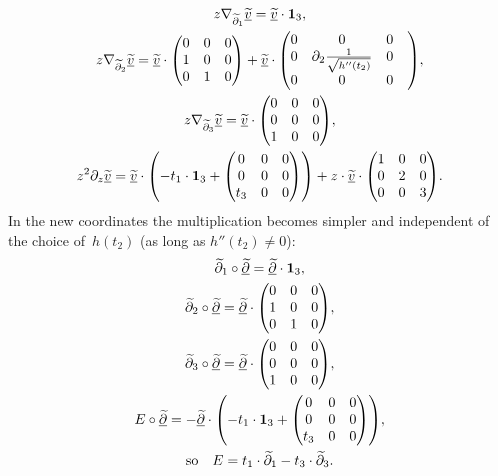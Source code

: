 \documentclass[10pt,a4paper]{amsart}
\numberwithin{equation}{section}
\numberwithin{figure}{section}
\newcommand{\www}{\widetilde}
\newcommand{\uuuu}{\underline}
\newcommand{\paa}{\partial}
\newcommand{\nnn}{\nabla}
\begin{document}
\begin{gather*}%
z\nnn_{\www\paa_1}\uuuu{\www v}=\uuuu{\www v}\cdot {\bf 1}_3,
\\
z\nnn_{\www\paa_2}\uuuu{\www v}=\uuuu{\www v}\cdot
\begin{pmatrix}0&0&0\\1&0&0\\0&1&0\end{pmatrix}
+\uuuu{\www v}\cdot
\begin{pmatrix}0&0&0\\0&\paa_2\frac{1}{\sqrt{h''(t_2)}}&0
\\
0&0&0&\end{pmatrix}\!,
\\
z\nnn_{\www\paa_3}\uuuu{\www v}=\uuuu{\www v}\cdot
\begin{pmatrix}0&0&0\\0&0&0\\1&0&0\end{pmatrix}\!,
\\
z^2\paa_z\uuuu{\www v}=\uuuu{\www v}\cdot
\left(-t_1\cdot {\bf 1}_3
+\begin{pmatrix}0&0&0\\0&0&0\\t_3&0&0\end{pmatrix}\right)
+z\cdot\uuuu{\www v}\cdot
\begin{pmatrix}1&0&0\\0&2&0\\0&0&3\end{pmatrix}\!.\nonumber
\end{gather*}
In the new coordinates the multiplication becomes simpler
and independent of the choice of~$h(t_2)$ (as long as
$h''(t_2)\neq 0$):
\begin{gather*}%
\www\paa_1\circ\uuuu{\www\paa}=\uuuu{\www\paa}\cdot {\bf 1}_3,
\\
\www\paa_2\circ\uuuu{\www\paa}=\uuuu{\www\paa}\cdot
\begin{pmatrix}0&0&0\\1&0&0\\0&1&0\end{pmatrix}\!,
\\
\www\paa_3\circ\uuuu{\www\paa}= \uuuu{\www\paa}\cdot
\begin{pmatrix}0&0&0\\0&0&0\\1&0&0\end{pmatrix}\!,
\\
E\circ\uuuu{\www\paa}= -\uuuu{\www\paa}\cdot\left({-}t_1\cdot {\bf 1}_3
+\begin{pmatrix}0&0&0\\0&0&0\\t_3&0&0\end{pmatrix}\right)\!,
\\
\text{so}\quad E= t_1\cdot\www\paa_1-t_3\cdot\www\paa_3.
\end{gather*}
\end{document}
